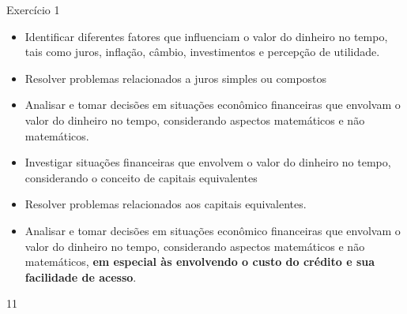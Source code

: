 \def\currentcolor{cor1}
\begin{objectives}{Exercício 1}
{
\begin{itemize}
\item Identificar diferentes fatores que influenciam o valor do dinheiro no tempo, tais como juros, inflação, câmbio, investimentos e percepção de utilidade.
\item Resolver problemas relacionados a juros simples ou compostos
\item Analisar e tomar decisões em situações econômico financeiras que envolvam o valor do dinheiro no tempo, considerando aspectos matemáticos e não matemáticos.
\end{itemize}
\begin{itemize}
\item Investigar situações financeiras que envolvem o valor do dinheiro no tempo, considerando o conceito de capitais equivalentes 
\item Resolver problemas relacionados aos capitais equivalentes.
\item Analisar e tomar decisões em situações econômico financeiras que envolvam o valor do dinheiro no tempo, considerando aspectos matemáticos e não matemáticos, \textbf{em especial às envolvendo o custo do crédito e sua facilidade de acesso}.
\end{itemize}
}{1}{1}
\end{objectives}

